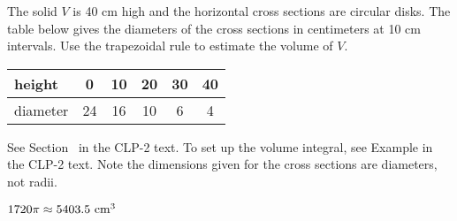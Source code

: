 \begin{question}[1997D]\label{prob_s1.11_tableproblem1}
The solid $V$ is 40 cm high and the horizontal cross sections
are circular disks. The table below gives the diameters of the cross sections
in centimeters at 10 cm intervals. Use the trapezoidal rule to estimate
the volume of $V$.

\renewcommand{\arraystretch}{1.1}
\begin{center}
     \begin{tabular}{|l|c|c|c|c|c|}
          \hline
          height&0&10&20&30&40  \\
          \hline
          diameter&24&16&10&6&4 \\
          \hline
     \end{tabular}
\end{center}
\renewcommand{\arraystretch}{1.0}
\end{question}

\begin{hint}
See Section~ in the
CLP-2 text.
To set up the volume integral, see Example  in the
CLP-2 text. Note the dimensions given for the cross sections are diameters, not radii.
\end{hint}

\begin{answer}
$1720\pi\approx 5403.5\ {\rm cm}^3$
\end{answer}

